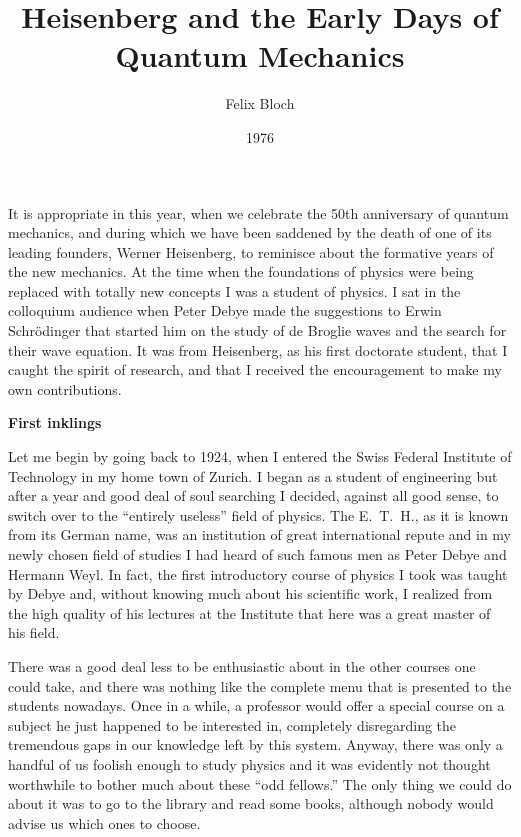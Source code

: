 \documentclass[12pt]{article}
\title{Heisenberg and the Early Days of Quantum Mechanics}
\author{Felix Bloch}
\date{1976}
\begin{document}
\maketitle

\noindent
It is appropriate in this year, when we celebrate the 50th anniversary of quantum mechanics, and during which we have been saddened by the death of one of its leading founders, Werner Heisenberg, to reminisce about the formative years of the new mechanics. At the time when the foundations of physics were being replaced with totally new concepts I was a student of physics. I sat in the colloquium audience when Peter Debye made the suggestions to Erwin Schr\"odinger that started him on the study of de Broglie waves and the search for their wave equation. It was from Heisenberg, as his first doctorate student, that I caught the spirit of research, and that I received the encouragement to make my own contributions.

\bigskip
\noindent
{\bf First inklings}

\smallskip
Let me begin by going back to 1924, when I entered the Swiss Federal Institute of Technology in my home town of Zurich. I began as a student of engineering but after a year and good deal of soul searching I decided, against all good sense, to switch over to the ``entirely useless'' field of physics. The E.~T.~H., as it is known from its German name, was an institution of great international repute and in my newly chosen field of studies I
had heard of such famous men as Peter Debye and Hermann Weyl. In fact, the first introductory course of physics I took was taught by Debye and, without knowing much about his scientific work, I realized from the high quality of his lectures at the Institute that here was a great master of his field.

There was a good deal less to be enthusiastic about in the other courses one
could take, and there was nothing like the complete menu that is presented to the students nowadays. Once in a while, a professor would offer a special course on a subject he just happened to be interested in, completely disregarding the tremendous gaps in our knowledge left by this system. Anyway, there was only a handful of us foolish enough to study physics and it was evidently not thought worthwhile to bother much about these ``odd fellows.'' The only thing we could do about it was to go to the library and read some books, although nobody would advise us which ones to choose.
\end{document}
